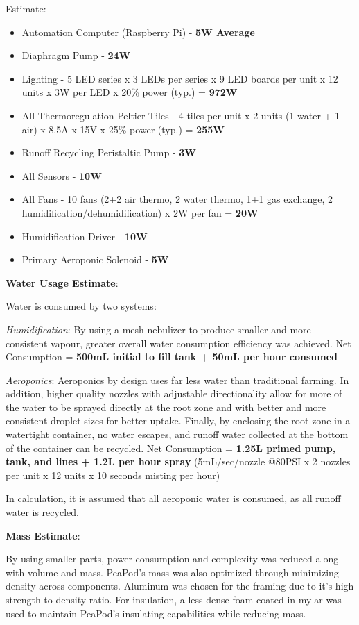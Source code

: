 \documentclass{report}
\begin{document}
Estimate:
\begin{itemize}
    \item Automation Computer (Raspberry Pi) - \textbf{5W Average}
    \item Diaphragm Pump - \textbf{24W} 
    \item Lighting - 5 LED series x 3 LEDs per series x 9 LED boards per unit x 12 units x 3W per LED x 20\% power (typ.) = \textbf{972W}
    \item All Thermoregulation Peltier Tiles - 4 tiles per unit x 2 units (1 water + 1 air) x 8.5A x 15V x 25\% power (typ.) = \textbf{255W}
    \item Runoff Recycling Peristaltic Pump - \textbf{3W}
    \item All Sensors - \textbf{10W}
    \item All Fans - 10 fans (2+2 air thermo, 2 water thermo, 1+1 gas exchange, 2 humidification/dehumidification) x 2W per fan = \textbf{20W}
    \item Humidification Driver - \textbf{10W}
    \item Primary Aeroponic Solenoid - \textbf{5W}
\end{itemize}

\textbf{Water Usage Estimate}:

Water is consumed by two systems:

\textit{Humidification}: By using a mesh nebulizer to produce smaller and more consistent vapour, greater overall water consumption efficiency was achieved. Net Consumption = \textbf{500mL initial to fill tank + 50mL per hour consumed}

\textit{Aeroponics}: Aeroponics by design uses far less water than traditional farming. In addition, higher quality nozzles with adjustable directionality allow for more of the water to be sprayed directly at the root zone and with better and more consistent droplet sizes for better uptake. Finally, by enclosing the root zone in a watertight container, no water escapes, and runoff water collected at the bottom of the container can be recycled. Net Consumption = \textbf{1.25L primed pump, tank, and lines + 1.2L per hour spray} (5mL/sec/nozzle @80PSI x 2 nozzles per unit x 12 units x 10 seconds misting per hour)

In calculation, it is assumed that all aeroponic water is consumed, as all runoff water is recycled.

\textbf{Mass Estimate}:

By using smaller parts, power consumption and complexity was reduced along with volume and mass. PeaPod's mass was also optimized through minimizing density across components. Aluminum was chosen for the framing due to it's high strength to density ratio. For insulation, a less dense foam coated in mylar was used to maintain PeaPod's insulating capabilities while reducing mass.
\end{document}
